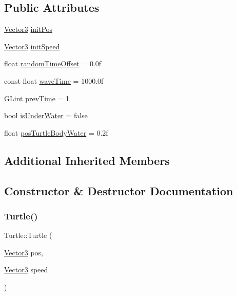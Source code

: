 \subsection*{Public Attributes}
\begin{DoxyCompactItemize}
\item 
\hyperlink{class_vector3}{Vector3} \hyperlink{class_turtle_a9052d3e0b90f7334d5fb3ac37617b3a6}{init\+Pos}
\item 
\hyperlink{class_vector3}{Vector3} \hyperlink{class_turtle_a085cc226004058c86277dfe21a2dc077}{init\+Speed}
\item 
float \hyperlink{class_turtle_a827a4dc9095185fd3e7fd1a56e6e3587}{random\+Time\+Offset} = 0.\+0f
\item 
const float \hyperlink{class_turtle_ab854ea2525dee2b36f2eba8f16573287}{wave\+Time} = 1000.\+0f
\item 
G\+Lint \hyperlink{class_turtle_a786de5c643f4bb563bbf851da057a85b}{prev\+Time} = 1
\item 
bool \hyperlink{class_turtle_a4a81d2f3cef8a9d8556f05b6356d0fd2}{is\+Under\+Water} = false
\item 
float \hyperlink{class_turtle_a4e52ca74d8dff20d4e1aa16a1774dea4}{pos\+Turtle\+Body\+Water} = 0.\+2f
\end{DoxyCompactItemize}
\subsection*{Additional Inherited Members}


\subsection{Constructor \& Destructor Documentation}
\mbox{\label{class_turtle_a970240e0b41cea58ef93f8f0d3e17fd4}} 
\subsubsection{\texorpdfstring{Turtle()}{Turtle()}}
{\footnotesize\ttfamily Turtle\+::\+Turtle (\begin{DoxyParamCaption}\item[{\hyperlink{class_vector3}{Vector3}}]{pos,  }\item[{\hyperlink{class_vector3}{Vector3}}]{speed }\end{DoxyParamCaption})\hspace{0.3cm}{\ttfamily [inline]}}



